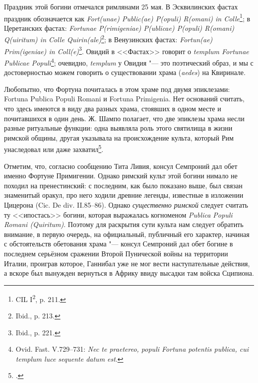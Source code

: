 Праздник этой богини отмечался римлянами 25 мая. В Эсквилинских фастах праздник обозначается как \textit{Fort(unae) Public(ae) P(opuli) R(omani) in Colle}\footnote{CIL I\textsuperscript{2}, p. 211.}; в Церетанских фастах: \textit{Fortunae P(rimigeniae) P(ublicae) P(opuli) R(omani) Q(uiritum) in Colle Quirin(ale)}\footnote{Ibid., p. 213.}; в Венузинских фастах: \textit{Fortun(ae) Prim(igeniae) in Coll(e)}\footnote{Ibid., p. 221.}. Овидий в <<Фастах>> говорит о \textit{templum Fortunae Publicae Populi}\footnote{Ovid. Fast. V.729--731: \textit{Nec te praetereo, populi Fortuna potentis publica, cui templum luce sequente datum est}.}; очевидно, \textit{templum} у Овидия "--- это поэтический образ, и мы с достоверностью можем говорить о существовании храма (\textit{aedes}) на Квиринале.

Любопытно, что Фортуна почиталась в этом храме под двумя эпиклезами: Fortuna Publica Populi Romani и Fortuna Primigenia. Нет оснований считать, что здесь имеются в виду два разных храма, стоявших в одном месте и почитавшихся в один день. Ж. Шампо полагает, что две эпиклезы храма несли разные ритуальные функции: одна выявляла роль этого святилища в жизни римской общины, другая указывала на происхождение культа, который Рим унаследовал или даже захватил\footcite[P. 9--10]{Champeaux1987}.

Отметим, что, согласно сообщению Тита Ливия, консул Семпроний дал обет именно Фортуне Примигении. Однако римский культ этой богини нимало не походил на пренестинский: с последним, как было показано выше, был связан знаменитый оракул, про него ходили древние легенды, известные в изложении Цицерона (Cic. De div. II.85--86). %
Однако \textit{существенно римской} следует считать ту <<ипостась>> богини, которая выражалась когноменом \textit{Publica Populi Romani (Quiritum)}. Поэтому для раскрытия сути культа нам следует обратить внимание, в первую очередь, на официальный, публичный его характер, начиная с обстоятельств обетования храма "--- консул Семпроний дал обет богине в последнем серьёзном сражении Второй Пунической войны на территории Италии, проиграв которое, Ганнибал уже не мог вести наступательные действия, а вскоре был вынужден вернуться в Африку ввиду высадки там войска Сципиона.


